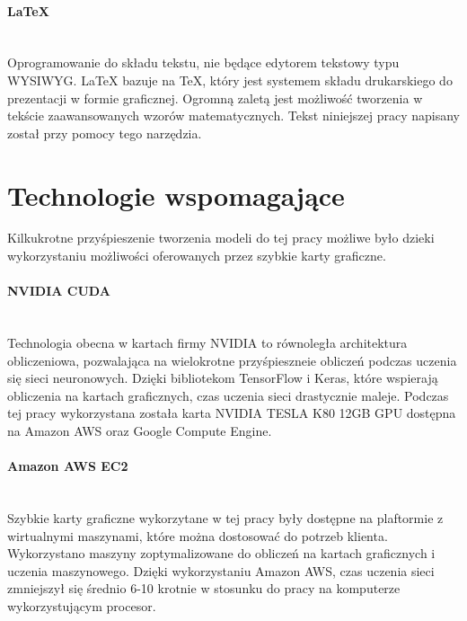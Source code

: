 \paragraph{LaTeX} \mbox{}\\
Oprogramowanie do składu tekstu, nie będące edytorem tekstowy typu WYSIWYG.
LaTeX bazuje na TeX, który jest systemem składu drukarskiego do prezentacji w
formie graficznej. Ogromną zaletą jest możliwość tworzenia w tekście zaawansowanych
wzorów matematycznych. Tekst niniejszej pracy napisany został przy pomocy tego narzędzia.

\section{Technologie wspomagające}
Kilkukrotne przyśpieszenie tworzenia modeli do tej pracy możliwe było dzieki wykorzystaniu
możliwości oferowanych przez szybkie karty graficzne.

\paragraph{NVIDIA CUDA} \mbox{}\\
Technologia obecna w kartach firmy NVIDIA to równoległa architektura obliczeniowa,
pozwalająca na wielokrotne przyśpieszneie obliczeń podczas uczenia się sieci neuronowych.
Dzięki bibliotekom TensorFlow i Keras, które wspierają obliczenia na kartach graficznych,
czas uczenia sieci drastycznie maleje. Podczas tej pracy wykorzystana została
karta NVIDIA TESLA K80 12GB GPU dostępna na Amazon AWS oraz Google Compute Engine.

\paragraph{Amazon AWS EC2} \mbox{}\\
Szybkie karty graficzne wykorzytane w tej pracy były dostępne na plaftormie z
wirtualnymi maszynami, które można dostosować do potrzeb klienta. Wykorzystano maszyny
zoptymalizowane do obliczeń na kartach graficznych i uczenia maszynowego.
Dzięki wykorzystaniu Amazon AWS, czas uczenia sieci zmniejszył się średnio 6-10 krotnie
w stosunku do pracy na komputerze wykorzystującym procesor.
